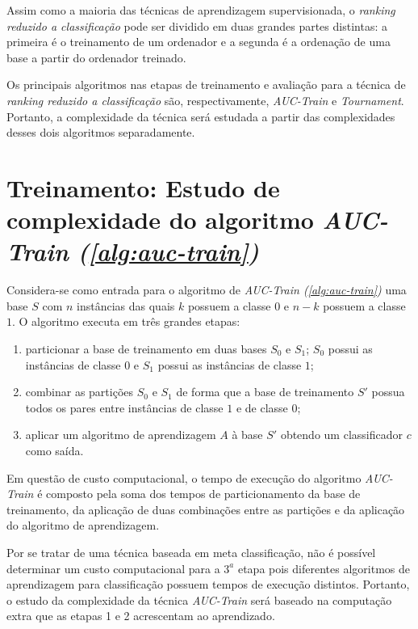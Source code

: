 Assim como a maioria das técnicas de aprendizagem supervisionada, o \emph{ranking reduzido a classificação} pode ser dividido em duas grandes partes distintas: a primeira é o treinamento de um ordenador e a segunda é a ordenação de uma base a partir do ordenador treinado.

Os principais algoritmos nas etapas de treinamento e avaliação para a técnica de \emph{ranking reduzido a classificação} são, respectivamente, \emph{AUC-Train} e \emph{Tournament}. Portanto, a complexidade da técnica será estudada a partir das complexidades desses dois algoritmos separadamente.


\section{Treinamento: Estudo de complexidade do algoritmo \emph{AUC-Train (\ref{alg:auc-train})}}

Considera-se como entrada para o algoritmo de \emph{AUC-Train (\ref{alg:auc-train})} uma base $S$ com $n$ instâncias das quais $k$ possuem a classe $0$ e $n - k$ possuem a classe $1$. O algoritmo executa em três grandes etapas:

\begin{enumerate}
    \item particionar a base de treinamento em duas bases $S_0$ e $S_1$; $S_0$ possui as instâncias de classe $0$ e $S_1$ possui as instâncias de classe $1$;
    \item combinar as partições $S_0$ e $S_1$ de forma que a base de treinamento $S'$ possua todos os pares entre instâncias de classe $1$ e de classe $0$;
    \item aplicar um algoritmo de aprendizagem $A$ à base $S'$ obtendo um classificador $c$ como saída.
\end{enumerate}

Em questão de custo computacional, o tempo de execução do algoritmo \emph{AUC-Train} é composto pela soma dos tempos de particionamento da base de treinamento, da aplicação de duas combinações entre as partições e da aplicação do algoritmo de aprendizagem.

Por se tratar de uma técnica baseada em meta classificação, não é possível determinar um custo computacional para a $3^a$ etapa pois diferentes algoritmos de aprendizagem para classificação possuem tempos de execução distintos. Portanto, o estudo da complexidade da técnica \emph{AUC-Train} será baseado na computação extra que as etapas 1 e 2 acrescentam ao aprendizado.

